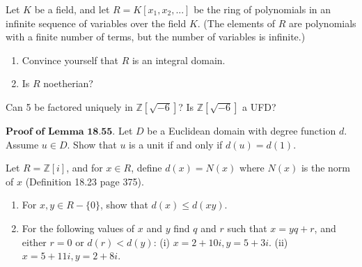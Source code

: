 \documentclass[12pt,letterpaper,boxed]{hmcpset}
\begin{document}

\begin{problem}[18.2.5]
Let $K$ be a field, and let $ R = K[x_1,x_2,...] $ be the ring of polynomials in an infinite sequence of variables over the field $K$. (The elements of $R$ are polynomials with a finite number of terms, but the number of variables is infinite.)
\begin{enumerate}[label=\alph*]
\item Convince yourself that $R$ is an integral domain.
\item Is $R$ noetherian?  
\end{enumerate}
\end{problem}

\begin{solution}
\end{solution}

\clearpage

\begin{problem}[18.3.9]
Can 5 be factored uniquely in $\mathbb{Z}[\sqrt{-6}]$? Is $\mathbb{Z}[\sqrt{-6}]$ a UFD?
\end{problem}

\begin{solution}
\end{solution}

\clearpage

\begin{problem}[18.4.1]
$\textbf{Proof of Lemma 18.55.}$ Let $D$ be a Euclidean domain with degree function $d$. Assume $u \in D$. Show that $u$ is a unit if and only if $d(u) = d(1)$.
\end{problem}

\begin{solution}
\end{solution}

\clearpage

\begin{problem}[18.4.6]
Let  $R = \mathbb{Z}[i]$, and for $x \in R$, define $d(x) = N(x)$ where $N(x)$ is the norm of $x$ (Definition 18.23 page 375).
\begin{enumerate}[label=\alph*]
\item For $x,y \in R - \{0\}$, show that $d(x) \leq d(xy)$.
\item For the following values of $x$ and $y$ find $q$ and $r$ such that $x = yq+r$, and either $r=0$ or $d(r) < d(y)$:
\newline
\indent (i) $ x = 2+10i, y = 5+3i$.
\newline
\indent (ii) $x = 5+11i, y = 2+8i$.
\end{enumerate}
\end{problem}
\end{document}
